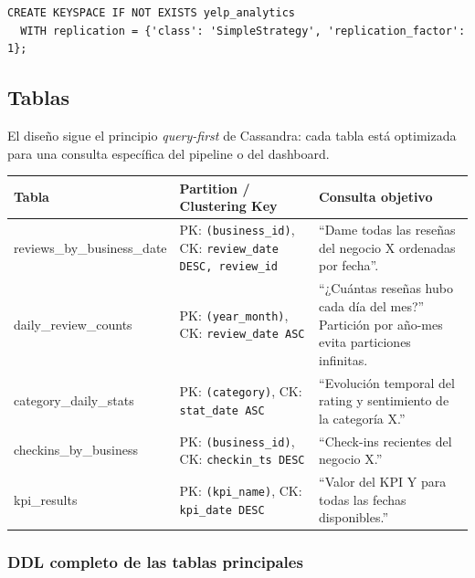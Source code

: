 \documentclass[12pt,a4paper]{article}
\begin{document}
\begin{lstlisting}[language=CQL]
CREATE KEYSPACE IF NOT EXISTS yelp_analytics
  WITH replication = {'class': 'SimpleStrategy', 'replication_factor': 1};
\end{lstlisting}

\subsection{Tablas}

El diseño sigue el principio \textit{query-first} de Cassandra: cada tabla está
optimizada para una consulta específica del pipeline o del dashboard.

\begin{longtable}{>{\ttfamily\small}p{4.8cm} p{4cm} p{5cm}}
\toprule
\normalfont\textbf{Tabla} & \normalfont\textbf{Partition / Clustering Key} & \normalfont\textbf{Consulta objetivo} \\
\midrule

reviews\_by\_business\_date &
PK: \texttt{(business\_id)}, CK: \texttt{review\_date DESC, review\_id} &
``Dame todas las reseñas del negocio X ordenadas por fecha''. \\[0.4em]

daily\_review\_counts &
PK: \texttt{(year\_month)}, CK: \texttt{review\_date ASC} &
``¿Cuántas reseñas hubo cada día del mes?'' Partición por año-mes evita particiones infinitas. \\[0.4em]

category\_daily\_stats &
PK: \texttt{(category)}, CK: \texttt{stat\_date ASC} &
``Evolución temporal del rating y sentimiento de la categoría X.'' \\[0.4em]

checkins\_by\_business &
PK: \texttt{(business\_id)}, CK: \texttt{checkin\_ts DESC} &
``Check-ins recientes del negocio X.'' \\[0.4em]

kpi\_results &
PK: \texttt{(kpi\_name)}, CK: \texttt{kpi\_date DESC} &
``Valor del KPI Y para todas las fechas disponibles.'' \\
\bottomrule
\end{longtable}

\subsubsection{DDL completo de las tablas principales}
\end{document}
